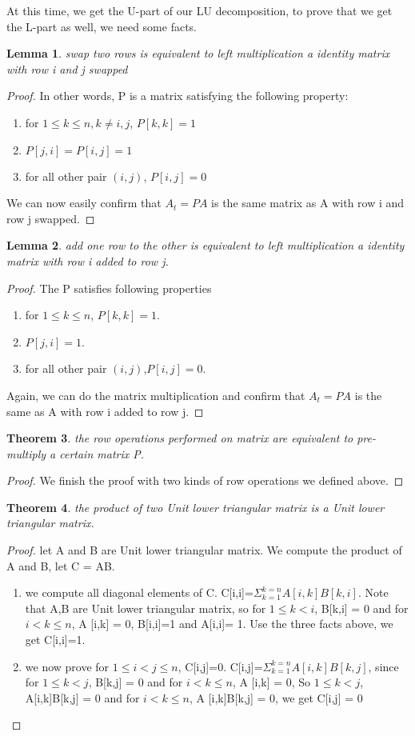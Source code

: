 \documentclass[11pt]{article}
\newtheorem{theorem}{Theorem}
\newtheorem{lemma}[theorem]{Lemma}
\begin{document}
At this time, we get the U-part of our LU decomposition, to prove that we get the L-part as well, we need some facts.
\begin{lemma}
swap two rows is equivalent to left multiplication a identity matrix with row i and j swapped
\end{lemma}
\begin{proof}
In other words, P is a matrix satisfying the following property:
\begin{enumerate}
	\item for $1\le k\le n,k \neq i,j$, $P[k,k]=1$
	\item $P[j,i]=P[i,j]=1$
	\item for all other pair $(i,j)$, $P[i, j] = 0$
\end{enumerate}
We can now easily confirm that $A_{t}=PA$ is the same matrix as A with row i and row j swapped.
\end{proof}
\begin{lemma}
add one row to the other is equivalent to left multiplication a identity matrix with row i added to row j.
\end{lemma}
\begin{proof}
The P satisfies following properties
\begin{enumerate}
	\item for $1 \le k \le n$, $P[k,k]=1$.
	\item $P[j,i]=1$.
	\item for all other pair $(i,j)$,$P[i,j]=0$.
\end{enumerate}
Again, we can do the matrix multiplication and confirm that $A_{t}=PA$ is the same as A with row i added to row j.
\end{proof}
\begin{theorem}
the row operations performed on matrix are equivalent to pre-multiply a certain matrix P.
\end{theorem}
\begin{proof}
We finish the proof with two kinds of row operations we defined above.
\end{proof}
\begin{theorem}
the product of two Unit lower triangular matrix is a Unit lower triangular matrix.
\end{theorem}
\begin{proof}
let A and B are Unit lower triangular matrix. We compute the product of A and B, let C = AB.
\begin{enumerate}
    \item we compute all diagonal elements of C.
    C[i,i]=$\Sigma_{k=1}^{k=n}A[i,k]B[k,i]$. Note that A,B are Unit lower triangular matrix, so for $1 \le k < i$, B[k,i] = 0 and for $i < k \le n$, A [i,k] = 0, B[i,i]=1 and A[i,i]= 1. Use the three facts above, we get C[i,i]=1.
    \item we now prove for $1 \le i < j \le n$, C[i,j]=0.
    C[i,j]=$\Sigma_{k=1}^{k=n}A[i,k]B[k,j]$, since for $1 \le k < j$, B[k,j] = 0 and for $i < k \le n$, A [i,k] = 0, So $1 \le k < j$, A[i,k]B[k,j] = 0 and for $i < k \le n$, A [i,k]B[k,j] = 0, we get C[i,j] = 0
\end{enumerate}
\end{proof}
\end{document}
